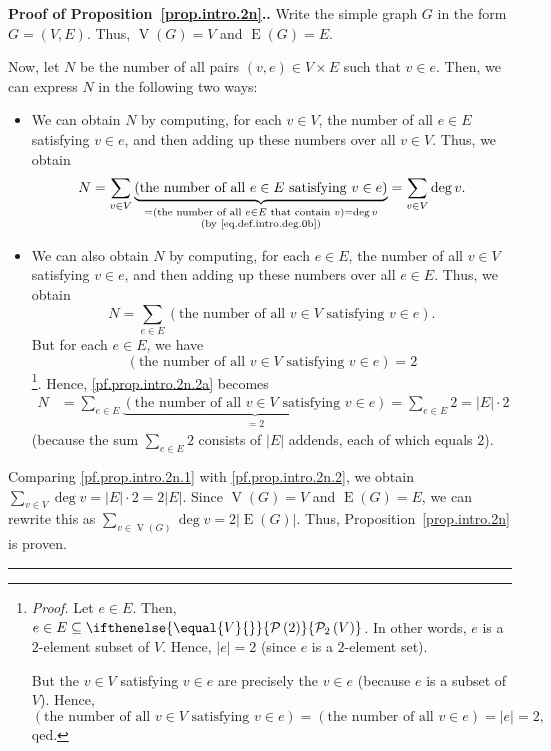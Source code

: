 \documentclass[numbers=enddot,12pt,final,onecolumn,notitlepage]{scrartcl}%
\theoremstyle{definition}
\newenvironment{proof}[1][Proof]{\noindent\textbf{#1.} }{\ \rule{0.5em}{0.5em}}
\let\sumnonlimits\sum
\renewcommand{\sum}{\sumnonlimits\limits}
\newcommand{\powset}[2][]{\ifthenelse{\equal{#2}{}}{\mathcal{P}\left(#1\right)}{\mathcal{P}_{#1}\left(#2\right)}}
\newcommand{\abs}[1]{\left| #1 \right|}
\newcommand{\tup}[1]{\left( #1 \right)}
\newcommand{\verts}[1]{\operatorname{V}\left( #1 \right)}
\newcommand{\edges}[1]{\operatorname{E}\left( #1 \right)}
\begin{document}
\begin{proof}[Proof of Proposition~\ref{prop.intro.2n}.]
Write the simple graph $G$ in the form $G = \tup{V, E}$. Thus,
$\verts{G} = V$ and $\edges{G} = E$.

Now, let $N$ be the number of all pairs $\tup{v, e} \in V \times E$
such that $v \in e$. Then, we can express $N$ in the following two
ways:

\begin{itemize}
\item We can obtain $N$ by computing, for each $v \in V$, the number
of all $e \in E$ satisfying $v \in e$, and then adding up these
numbers over all $v \in V$. Thus, we obtain
\begin{equation}
N
= \sum_{v \in V}
  \underbrace{\left(\text{the number of all } e \in E
                \text{ satisfying } v \in e\right)}_{
              \substack{= \left(\text{the number of all } e \in E
                \text{ that contain } v \right) = \deg v \\
                \text{(by \eqref{eq.def.intro.deg.0b}})}}
= \sum_{v \in V} \deg v .
\label{pf.prop.intro.2n.1}
\end{equation}

\item We can also obtain $N$ by computing, for each $e \in E$, the
number of all $v \in V$ satisfying $v \in e$, and then adding up these
numbers over all $e \in E$. Thus, we obtain
\begin{equation}
N
= \sum_{e \in E}
   \left(\text{the number of all } v \in V
          \text{ satisfying } v \in e\right) .
\label{pf.prop.intro.2n.2a}
\end{equation}
But for each $e \in E$, we have
\[
\left(\text{the number of all } v \in V
          \text{ satisfying } v \in e\right) = 2
\]
\footnote{\textit{Proof.} Let $e \in E$. Then,
$e \in E \subseteq \powset[2]{V}$. In other words, $e$ is a
$2$-element subset of $V$. Hence, $\abs{e} = 2$ (since $e$ is a
$2$-element set).

But the $v \in V$ satisfying $v \in e$ are precisely the $v \in e$
(because $e$ is a subset of $V$). Hence,
\[
\left(\text{the number of all } v \in V
          \text{ satisfying } v \in e\right)
= \left(\text{the number of all } v \in e \right)
= \abs{e} = 2 ,
\]
qed.}. Hence, \eqref{pf.prop.intro.2n.2a} becomes
\begin{align}
N
&= \sum_{e \in E}
   \underbrace{\left(\text{the number of all } v \in V
                 \text{ satisfying } v \in e\right)}_{= 2}
= \sum_{e \in E} 2 = \abs{E} \cdot 2
\label{pf.prop.intro.2n.2}
\end{align}
(because the sum $\sum_{e \in E} 2$ consists of $\abs{E}$ addends,
each of which equals $2$).
\end{itemize}

Comparing \eqref{pf.prop.intro.2n.1} with \eqref{pf.prop.intro.2n.2},
we obtain $\sum_{v \in V} \deg v = \abs{E} \cdot 2 = 2 \abs{E}$.
Since $\verts{G} = V$ and $\edges{G} = E$, we can rewrite this as
$\sum_{v \in \verts{G}} \deg v = 2 \abs{\edges{G}}$.
Thus, Proposition~\ref{prop.intro.2n} is proven.
\end{proof}
\end{document}
